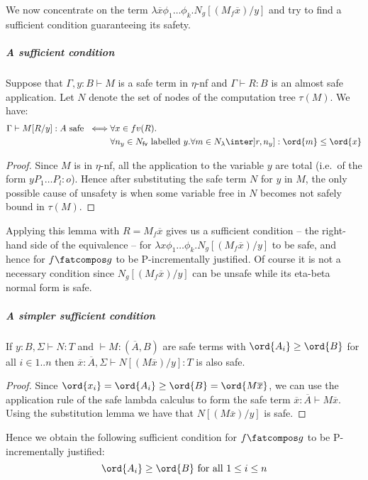 We now concentrate on the term  $\lambda \overline{x} \phi_1 \dots
\phi_k. N_g [(M_f  \overline{x}) / y]$ and try to find a sufficient
condition guaranteeing its safety.

\subparagraph{A sufficient condition}
\begin{lemma}
Suppose that $\Gamma,y:B \vdash M$ is a safe term in $\eta$-nf and $\Gamma \vdash R : B$ is an almost safe application. Let $N$ denote the set of nodes of the computation tree $\tau(M)$. We have:
\begin{align*}
\Gamma \vdash M[R/y] :A \mbox{ safe }
\iff&  \forall x \in fv(R) . \\
    & \forall n_y \in N_{\sf fv} \mbox{ labelled $y$}.
      \forall m \in N_{\lambda} \inter ]r,n_y] : \ord{m} \leq \ord{x}
\end{align*}
\end{lemma}
\begin{proof}
Since $M$ is in $\eta$-nf, all the application to the variable $y$ are total (i.e.~of the form $y P_1 \ldots P_l :o$). Hence after substituting the safe term $N$ for $y$ in $M$, the only possible cause of unsafety is when
some variable free in $N$ becomes not safely bound in $\tau(M)$.
\end{proof}

Applying this lemma with $R= M_f \overline{x}$ gives us a sufficient
condition -- the right-hand side of the equivalence -- for $\lambda
x \phi_1 \dots \phi_k. N_g [(M_f \overline{x}) / y]$ to be safe, and
hence for $f\fatcompos g$ to be P-incrementally justified. Of course
it is not a necessary condition since $N_g[(M_f \overline{x}) /y]$
can be unsafe while its eta-beta normal form is safe.

\subparagraph{A simpler sufficient condition}
\begin{lemma}
If $y:B, \Sigma \vdash N : T$ and $\vdash M : (\overline{A}, B)$
are safe terms with $\ord{A_i} \geq \ord{B}$ for all $i\in 1..n$
then $\overline{x}:\overline{A}, \Sigma \vdash N[(M \overline{x})/y] :T$ is also safe.
\end{lemma}
\begin{proof}
Since $\ord{x_i} = \ord{A_i} \geq \ord{B} = \ord{M \overline{x}}$, we can use the application
rule of the safe lambda calculus to form the safe term $\overline{x}:\overline{A} \vdash M \overline{x}$.
Using the substitution lemma we have that $N[(M \overline{x})/y]$ is safe.
\end{proof}

Hence we obtain the following sufficient condition for $f\fatcompos
g$ to be P-incrementally justified:
$$\ord{A_i}\geq\ord{B} \mbox{ for all } 1 \leq i \leq n$$


